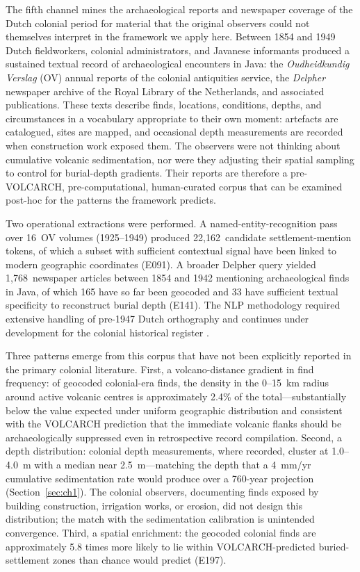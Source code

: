 \documentclass[12pt,a4paper]{article}
\begin{document}
The fifth channel mines the archaeological reports and newspaper coverage of the Dutch colonial period for material that the original observers could not themselves interpret in the framework we apply here. Between 1854 and 1949 Dutch fieldworkers, colonial administrators, and Javanese informants produced a sustained textual record of archaeological encounters in Java: the \textit{Oudheidkundig Verslag} (OV) annual reports of the colonial antiquities service, the \textit{Delpher} newspaper archive of the Royal Library of the Netherlands, and associated publications. These texts describe finds, locations, conditions, depths, and circumstances in a vocabulary appropriate to their own moment: artefacts are catalogued, sites are mapped, and occasional depth measurements are recorded when construction work exposed them. The observers were not thinking about cumulative volcanic sedimentation, nor were they adjusting their spatial sampling to control for burial-depth gradients. Their reports are therefore a pre-VOLCARCH, pre-computational, human-curated corpus that can be examined post-hoc for the patterns the framework predicts.

Two operational extractions were performed. A named-entity-recognition pass over 16~OV volumes (1925--1949) produced 22{,}162~candidate settlement-mention tokens, of which a subset with sufficient contextual signal have been linked to modern geographic coordinates (E091). A broader Delpher query yielded 1{,}768~newspaper articles between 1854 and 1942 mentioning archaeological finds in Java, of which 165 have so far been geocoded and 33 have sufficient textual specificity to reconstruct burial depth (E141). The NLP methodology required extensive handling of pre-1947 Dutch orthography and continues under development for the colonial historical register \citep{verberne2024}.

Three patterns emerge from this corpus that have not been explicitly reported in the primary colonial literature. First, a volcano-distance gradient in find frequency: of geocoded colonial-era finds, the density in the 0--15~km radius around active volcanic centres is approximately 2.4\% of the total---substantially below the value expected under uniform geographic distribution and consistent with the VOLCARCH prediction that the immediate volcanic flanks should be archaeologically suppressed even in retrospective record compilation. Second, a depth distribution: colonial depth measurements, where recorded, cluster at 1.0--4.0~m with a median near 2.5~m---matching the depth that a 4~mm/yr cumulative sedimentation rate would produce over a 760-year projection (Section~\ref{sec:ch1}). The colonial observers, documenting finds exposed by building construction, irrigation works, or erosion, did not design this distribution; the match with the sedimentation calibration is unintended convergence. Third, a spatial enrichment: the geocoded colonial finds are approximately 5.8 times more likely to lie within VOLCARCH-predicted buried-settlement zones than chance would predict (E197).
\end{document}
